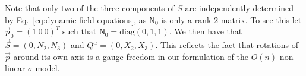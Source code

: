 Note that only two of the three components of $S$ are independently determined by Eq.~\ref{eq:dynamic field equations}, as $\mathsf{N}_0$ is only a rank 2 matrix. To see this let $\vec{p}_0 = (1\ 0\ 0)^T$ such that $\mathsf{N}_0 = \text{diag}(0,1,1)$. We then have that $\vec{S} = (0, N_2, N_3)$ and $Q^\alpha = (0, X_2, X_3)$. This reflects the fact that rotations of $\vec{p}$ around its own axis is a gauge freedom in our formulation of the $O(n)$ non-linear $\sigma$ model.

